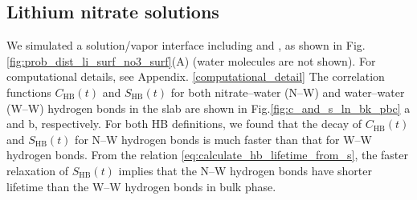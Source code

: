 \subsection{Lithium nitrate solutions} \label{PARAGRAPH_LINO3}
%
%
We simulated a \LiN solution/vapor interface including \Li and \nitrate, as shown in Fig.\thinspace\ref{fig:prob_dist_li_surf_no3_surf}(A) (water molecules are not shown). 
For computational details, see Appendix. \ref{computational_detail}
The correlation functions $C_\text{HB}(t)$ and $S_\text{HB}(t)$ for both nitrate--water (N--W) and water--water (W--W) hydrogen bonds 
in the slab are shown in Fig.\thinspace\ref{fig:c_and_s_ln_bk_pbc} a and b, respectively.
For both HB definitions, we found that the decay of $C_\text{HB}(t)$ and $S_\text{HB}(t)$ for N--W hydrogen bonds is much faster 
than that for W--W hydrogen bonds. From the relation \ref{eq:calculate_hb_lifetime_from_s}, the faster relaxation of $S_\text{HB}(t)$ implies that 
the N--W hydrogen bonds have shorter lifetime than the W--W hydrogen bonds in bulk phase. 
